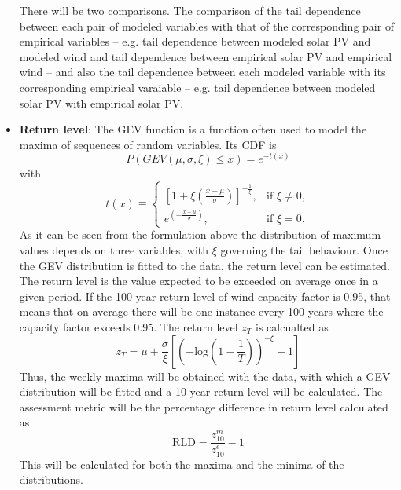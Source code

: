 \begin{itemize}
    There will be two comparisons. The comparison of the tail dependence between each pair of modeled variables with that of the corresponding pair of empirical variables -- e.g. tail dependence between modeled solar PV and modeled wind and tail dependence between empirical solar PV and empirical wind -- and also the tail dependence between each modeled variable with its corresponding empirical varaiable -- e.g. tail dependence between modeled solar PV with empirical solar PV.  
    \item \textbf{Return level}: The GEV function is a function often used to model the maxima of sequences of random variables. Its CDF is
    \begin{equation}
        P\left(GEV\left(\mu,\sigma,\xi\right)\leq x\right)=e^{-t\left(x\right)}
    \end{equation}
    with
    \begin{equation}
        t\left(x\right)\equiv 
        \begin{cases} 
        \left[ 1 + \xi \left( \frac{x - \mu}{\sigma} \right) \right]^{- \frac{1}{\xi}}, & \text{if } \xi \neq 0, \\
        e^{\left( - \frac{x - \mu}{\sigma} \right)}, & \text{if } \xi = 0.
        \end{cases}
    \end{equation}
    As it can be seen from the formulation above the distribution of maximum values depends on three variables, with $\xi$ governing the tail behaviour. Once the GEV distribution is fitted to the data, the return level can be estimated. The return level is the value expected to be exceeded on average once in a given period. If the 100 year return level of wind capacity factor is 0.95, that means that on average there will be one instance every 100 years where the capacity factor exceeds 0.95. The return level $z_T$ is calcualted as 
    \begin{equation}
        z_T=\mu+\frac{\sigma}{\xi}\left[\left(-\text{log}\left(1-\frac{1}{T}\right)\right)^{-\xi}-1\right]
    \end{equation}
    Thus, the weekly maxima will be obtained with the data, with which a GEV distribution will be fitted and a 10 year return level will be calculated. The assessment metric will be the percentage difference in return level calculated as 
    \begin{equation}
        \text{RLD}=\frac{z^m_{10}}{z^e_{10}}-1
    \end{equation}
    This will be calculated for both the maxima and the minima of the distributions. 
\end{itemize}

